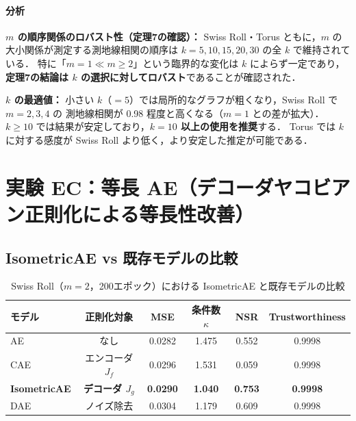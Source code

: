 \documentclass[12pt,a4paper]{ltjsarticle}  %
\begin{document}
\paragraph{分析}
\textbf{$m$ の順序関係のロバスト性（定理7の確認）：}
Swiss Roll・Torus ともに，$m$ の大小関係が測定する測地線相関の順序は
$k = 5, 10, 15, 20, 30$ の全 $k$ で維持されている．
特に「$m = 1 \ll m \geq 2$」という臨界的な変化は $k$ によらず一定であり，
\textbf{定理7の結論は $k$ の選択に対してロバスト}であることが確認された．

\textbf{$k$ の最適値：}
小さい $k$（$= 5$）では局所的なグラフが粗くなり，Swiss Roll で $m = 2, 3, 4$ の
測地線相関が 0.98 程度と高くなる（$m = 1$ との差が拡大）．
$k \geq 10$ では結果が安定しており，\textbf{$k = 10$ 以上の使用を推奨}する．
Torus では $k$ に対する感度が Swiss Roll より低く，より安定した推定が可能である．

\section{実験 EC：等長 AE（デコーダヤコビアン正則化による等長性改善）}

\subsection{IsometricAE vs 既存モデルの比較}

\begin{table}[H]
  \centering
  \caption{Swiss Roll（$m = 2$，200エポック）における IsometricAE と既存モデルの比較}
  \label{tab:ec}
  \renewcommand{\arraystretch}{1.2}
  \begin{tabular}{lccccc}
    \toprule
    モデル & 正則化対象 & MSE & 条件数 $\kappa$ & NSR & Trustworthiness \\
    \midrule
    AE          & なし              & 0.0282 & 1.475 & 0.552 & 0.9998 \\
    CAE         & エンコーダ $J_f$ & 0.0296 & 1.531 & 0.059 & 0.9998 \\
    \textbf{IsometricAE} & \textbf{デコーダ $J_g$} & \textbf{0.0290} & \textbf{1.040} & \textbf{0.753} & \textbf{0.9998} \\
    DAE         & ノイズ除去        & 0.0304 & 1.179 & 0.609 & 0.9998 \\
    \bottomrule
  \end{tabular}
\end{table}
\end{document}
